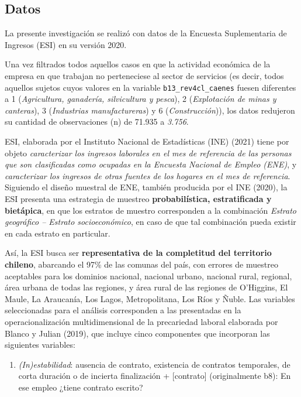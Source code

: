 \documentclass[
]{article}
\providecommand{\tightlist}{%
  \setlength{\itemsep}{0pt}\setlength{\parskip}{0pt}}
\begin{document}
\hypertarget{datos}{%
\subsection{Datos}\label{datos}}

La presente investigación se realizó con datos de la Encuesta
Suplementaria de Ingresos (ESI) en su versión 2020.

Una vez filtrados todos aquellos casos en que la actividad económica de
la empresa en que trabajan no perteneciese al sector de servicios (es
decir, todos aquellos sujetos cuyos valores en la variable
\texttt{b13\_rev4cl\_caenes} fuesen diferentes a 1 (\emph{Agricultura,
ganadería, silvicultura y pesca}), 2 (\emph{Explotación de minas y
canteras}), 3 (\emph{Industrias manufactureras}) y 6
(\emph{Construcción})), los datos redujeron su cantidad de observaciones
(n) de 71.935 a \emph{3.756}.

ESI, elaborada por el Instituto Nacional de Estadísticas (INE) (2021)
tiene por objeto \emph{caracterizar los ingresos laborales en el mes de
referencia de las personas que son clasificadas como ocupadas en la
Encuesta Nacional de Empleo (ENE)}, y \emph{caracterizar los ingresos de
otras fuentes de los hogares en el mes de referencia}. Siguiendo el
diseño muestral de ENE, también producida por el INE (2020), la ESI
presenta una estrategia de muestreo \textbf{probabilística,
estratificada y bietápica}, en que los estratos de muestro corresponden
a la combinación \emph{Estrato geográfico -- Estrato socioeconómico}, en
caso de que tal combinación pueda existir en cada estrato en particular.

Así, la ESI busca ser \textbf{representativa de la completitud del
territorio chileno}, abarcando el 97\% de las comunas del país, con
errores de muestreo aceptables para los dominios nacional, nacional
urbano, nacional rural, regional, área urbana de todas las regiones, y
área rural de las regiones de O'Higgins, El Maule, La Araucanía, Los
Lagos, Metropolitana, Los Ríos y Ñuble. Las variables seleccionadas para
el análisis corresponden a las presentadas en la operacionalización
multidimensional de la precariedad laboral elaborada por Blanco y Julian
(2019), que incluye cinco componentes que incorporan las siguientes
variables:

\begin{enumerate}
\def\labelenumi{\arabic{enumi}.}
\tightlist
\item
  \emph{(In)estabilidad}: ausencia de contrato, existencia de contratos
  temporales, de corta duración o de incierta finalización +
  {[}contrato{]} (originalmente b8): En ese empleo ¿tiene contrato
  escrito?
\end{enumerate}
\end{document}
